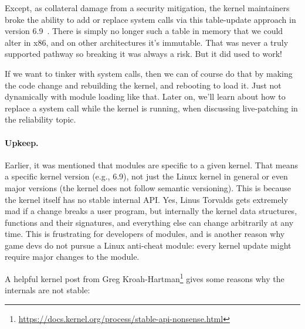 Except, as collateral damage from a security mitigation, the kernel maintainers broke the ability to add or replace system calls via this table-update approach in version 6.9~\cite{pomerantz2000lkmpg}. There is simply no longer such a table in memory that we could alter in x86, and on other architectures it's immutable. That was never a truly supported pathway so breaking it was always a risk. But it did used to work! 

If we want to tinker with system calls, then we can of course do that by making the code change and rebuilding the kernel, and rebooting to load it. Just not dynamically with module loading like that. Later on, we'll learn about how to replace a system call while the kernel is running, when discussing live-patching in the reliability topic.

\paragraph{Upkeep.} Earlier, it was mentioned that modules are specific to a given kernel. That means a specific kernel version (e.g., 6.9), not just the Linux kernel in general or even major versions (the kernel does not follow semantic versioning). This is because the kernel itself has no stable internal API. Yes, Linus Torvalds gets extremely mad if a change breaks a user program, but internally the kernel data structures, functions and their signatures, and everything else can change arbitrarily at any time. This is frustrating for developers of modules, and is another reason why game devs do not pursue a Linux anti-cheat module: every kernel update might require major changes to the module.

A helpful kernel post from Greg Kroah-Hartman\footnote{ \url{https://docs.kernel.org/process/stable-api-nonsense.html} } gives some reasons why the internals are not stable:

